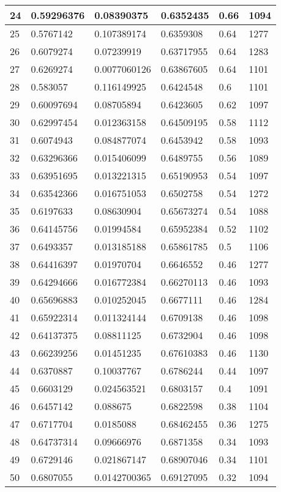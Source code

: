\begin{longtable}{|l|l|l|l|l|l|}
24 & 0.59296376 & 0.08390375 & 0.6352435 & 0.66 & 1094 \\ \hline 
25 & 0.5767142 & 0.107389174 & 0.6359308 & 0.64 & 1277 \\ \hline 
26 & 0.6079274 & 0.07239919 & 0.63717955 & 0.64 & 1283 \\ \hline 
27 & 0.6269274 & 0.0077060126 & 0.63867605 & 0.64 & 1101 \\ \hline 
28 & 0.583057 & 0.116149925 & 0.6424548 & 0.6 & 1101 \\ \hline 
29 & 0.60097694 & 0.08705894 & 0.6423605 & 0.62 & 1097 \\ \hline 
30 & 0.62997454 & 0.012363158 & 0.64509195 & 0.58 & 1112 \\ \hline 
31 & 0.6074943 & 0.084877074 & 0.6453942 & 0.58 & 1093 \\ \hline 
32 & 0.63296366 & 0.015406099 & 0.6489755 & 0.56 & 1089 \\ \hline 
33 & 0.63951695 & 0.013221315 & 0.65190953 & 0.54 & 1097 \\ \hline 
34 & 0.63542366 & 0.016751053 & 0.6502758 & 0.54 & 1272 \\ \hline 
35 & 0.6197633 & 0.08630904 & 0.65673274 & 0.54 & 1088 \\ \hline 
36 & 0.64145756 & 0.01994584 & 0.65952384 & 0.52 & 1102 \\ \hline 
37 & 0.6493357 & 0.013185188 & 0.65861785 & 0.5 & 1106 \\ \hline 
38 & 0.64416397 & 0.01970704 & 0.6646552 & 0.46 & 1277 \\ \hline 
39 & 0.64294666 & 0.016772384 & 0.66270113 & 0.46 & 1093 \\ \hline 
40 & 0.65696883 & 0.010252045 & 0.6677111 & 0.46 & 1284 \\ \hline 
41 & 0.65922314 & 0.011324144 & 0.6709138 & 0.46 & 1098 \\ \hline 
42 & 0.64137375 & 0.08811125 & 0.6732904 & 0.46 & 1098 \\ \hline 
43 & 0.66239256 & 0.01451235 & 0.67610383 & 0.46 & 1130 \\ \hline 
44 & 0.6370887 & 0.10037767 & 0.6786244 & 0.44 & 1097 \\ \hline 
45 & 0.6603129 & 0.024563521 & 0.6803157 & 0.4 & 1091 \\ \hline 
46 & 0.6457142 & 0.088675 & 0.6822598 & 0.38 & 1104 \\ \hline 
47 & 0.6717704 & 0.0185088 & 0.68462455 & 0.36 & 1275 \\ \hline 
48 & 0.64737314 & 0.09666976 & 0.6871358 & 0.34 & 1093 \\ \hline 
49 & 0.6729146 & 0.021867147 & 0.68907046 & 0.34 & 1101 \\ \hline 
50 & 0.6807055 & 0.0142700365 & 0.69127095 & 0.32 & 1094 \\ \hline 
\end{longtable}